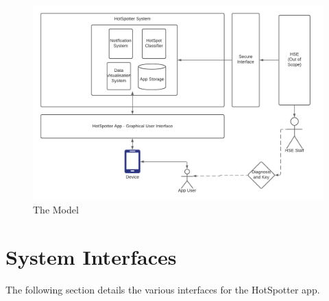 \documentclass{scrreprt}
\begin{document}
\\
\\ \begin{figure}[h!]
	\centering
	\includegraphics[width=0.9\linewidth]{InternalSystemComponents}
	\caption{The Model}
	\label{fig:System Components and Interfaces}
\end{figure}

\pagebreak
\section{System Interfaces}\label{SysInterface}
The following section details the various interfaces for the HotSpotter app.
\end{document}
